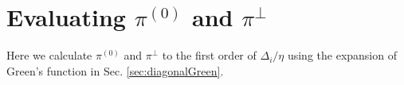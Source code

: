 %
%
%
%
%
%
%
%
%




\section{Evaluating $\pi^{(0)}$ and $\pi^{\perp}$\label{sec:calculatePi}}
Here we  calculate $\pi^{(0)}$ and $\pi^{\perp}$ to the first order of $\Delta_i/\eta$ using the expansion of Green's function in Sec. \ref{sec:diagonalGreen}.

